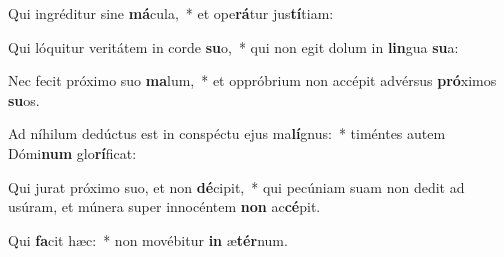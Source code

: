 \item Qui ingréditur sine \textbf{má}cula,~* et ope\textbf{rá}tur jus\textbf{tí}tiam:
\item Qui lóquitur veritátem in corde \textbf{su}o,~* qui non egit dolum in \textbf{lin}gua \textbf{su}a:
\item Nec fecit próximo suo \textbf{ma}lum,~* et oppróbrium non accépit advérsus \textbf{pró}ximos \textbf{su}os.
\item Ad níhilum dedúctus est in conspéctu ejus ma\textbf{lí}gnus:~* timéntes autem Dómi\textbf{num} glo\textbf{rí}ficat:
\item Qui jurat próximo suo, et non \textbf{dé}cipit,~* qui pecúniam suam non dedit ad usúram, et múnera super innocéntem \textbf{non} ac\textbf{cé}pit.
\item Qui \textbf{fa}cit hæc:~* non movébitur \textbf{in} æ\textbf{tér}num.
